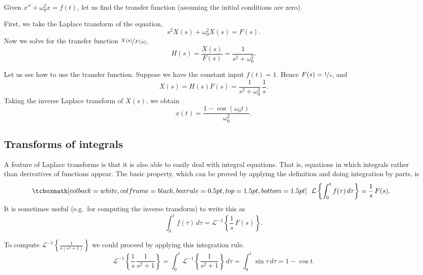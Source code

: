 \begin{example}
Given $x'' + \omega_0^2 x = f(t)$, let us find the transfer function
(assuming the initial conditions are zero).

First, we take the Laplace transform of the equation,
\begin{equation*}
s^2 X(s) + \omega_0^2 X(s) = F(s) .
\end{equation*}
Now we solve for the transfer function $\nicefrac{X(s)}{F(s)}$,
\begin{equation*}
H(s) = \frac{X(s)}{F(s)} = \frac{1}{s^2 + \omega_0^2} .
\end{equation*}

Let us see how to use the transfer function.  Suppose we have the constant input
$f(t) = 1$.  Hence $F(s) = \nicefrac{1}{s}$, and
\begin{equation*}
X(s) = H(s) F(s) = \frac{1}{s^2+\omega_0^2} \, \frac{1}{s} .
\end{equation*}
Taking the inverse Laplace transform of $X(s)$, we obtain
\begin{equation*}
x(t) = \frac{1-\cos(\omega_0 t)}{\omega_0^2} .
\end{equation*}
\end{example}

\subsection{Transforms of integrals}

A feature of Laplace transforms is that it is also able to easily deal
with integral equations.  That is, equations in which integrals rather than
derivatives of functions appear.  The basic property, which can be proved
by applying the definition and doing integration by parts, is 
\begin{equation*}
\mybxbg{~~
\mathcal{L} \left\{
\int_0^t f(\tau) \, d\tau
\right\} = \frac{1}{s} \, F(s) .
~~}
\end{equation*}
It is sometimes useful (e.g.\ for computing the inverse transform) to write
this as
\begin{equation*}
\int_0^t f(\tau) \, d\tau
=
{\mathcal{L}}^{-1} \left\{
\frac{1}{s} \, F(s) \right\} .
\end{equation*}

\begin{example}
To compute ${\mathcal{L}}^{-1} \left\{\frac{1}{s(s^2+1)}\right\}$ we could
proceed by applying this integration rule.  
\begin{equation*}
{\mathcal{L}}^{-1} \left\{
\frac{1}{s} \, \frac{1}{s^2+1} \right\} 
=
\int_0^t 
{\mathcal{L}}^{-1} \left\{
\frac{1}{s^2+1} \right\} \, d\tau
=
\int_0^t 
\sin \tau \, d\tau
=
1 - \cos t .
\end{equation*}
\end{example}


